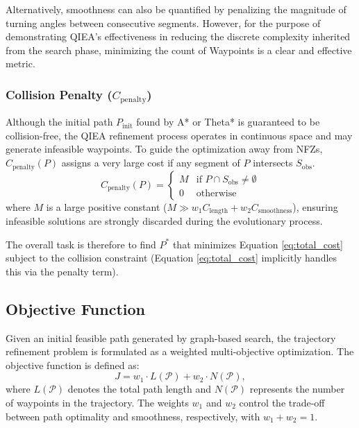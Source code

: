 Alternatively, smoothness can also be quantified by penalizing the magnitude of turning angles between consecutive segments. However, for the purpose of demonstrating QIEA's effectiveness in reducing the discrete complexity inherited from the search phase, minimizing the count of Waypoints is a clear and effective metric.

\subsubsection{Collision Penalty ($C_{\text{penalty}}$)}
Although the initial path $P_{\text{init}}$ found by A* or Theta* is guaranteed to be collision-free, the QIEA refinement process operates in continuous space and may generate infeasible waypoints. To guide the optimization away from NFZs, $C_{\text{penalty}}(P)$ assigns a very large cost if any segment of $P$ intersects $S_{\text{obs}}$.
\begin{equation}
    C_{\text{penalty}}(P) =
    \begin{cases}
        M & \text{if } P \cap S_{\text{obs}} \neq \emptyset \\
        0 & \text{otherwise}
    \end{cases}
    \label{eq:cost_penalty}
\end{equation}
where $M$ is a large positive constant ($M \gg w_1 C_{\text{length}} + w_2 C_{\text{smoothness}}$), ensuring infeasible solutions are strongly discarded during the evolutionary process.

The overall task is therefore to find $P^*$ that minimizes Equation \eqref{eq:total_cost} subject to the collision constraint (Equation \eqref{eq:total_cost} implicitly handles this via the penalty term).


\subsection{Objective Function}

Given an initial feasible path generated by graph-based search, the trajectory refinement problem is formulated as a weighted multi-objective optimization. The objective function is defined as:
\begin{equation}
J = w_1 \cdot L(\mathcal{P}) + w_2 \cdot N(\mathcal{P}),
\end{equation}
where $L(\mathcal{P})$ denotes the total path length and $N(\mathcal{P})$ represents the number of waypoints in the trajectory. The weights $w_1$ and $w_2$ control the trade-off between path optimality and smoothness, respectively, with $w_1 + w_2 = 1$.

